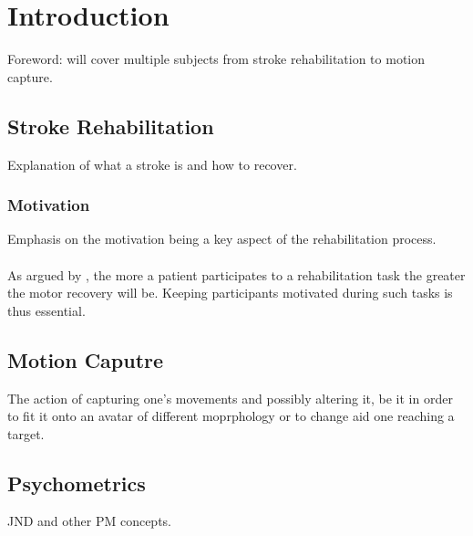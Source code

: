 
\chapter{Introduction} %

\label{Chapter1} %


Foreword: will cover multiple subjects from stroke rehabilitation to motion capture.

\section{Stroke Rehabilitation}

Explanation of what a stroke is and how to recover.

\subsection{Motivation}

Emphasis on the motivation being a key aspect of the rehabilitation process.
\\\\
As argued by \cite{flores2008improving}, the more a patient participates to a rehabilitation task the greater the motor recovery will be. Keeping participants motivated during such tasks is thus essential.

\section{Motion Caputre}

The action of capturing one's movements and possibly altering it, be it in order to fit
it onto an avatar of different moprphology or to change aid one reaching a target.

\section{Psychometrics}

JND and other PM concepts.
